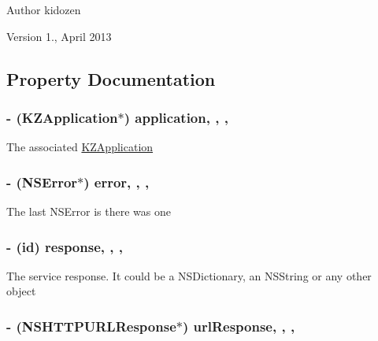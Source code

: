 \begin{DoxyAuthor}{Author}
kidozen 
\end{DoxyAuthor}
\begin{DoxyVersion}{Version}
1., April 2013 
\end{DoxyVersion}


\subsection{Property Documentation}
\hypertarget{interface_k_z_response_a169745670544dd0a05c0f1cca2815588}{
\subsubsection[{application}]{\setlength{\rightskip}{0pt plus 5cm}-\/ ({\bf K\-Z\-Application}$\ast$) application\hspace{0.3cm}{\ttfamily [read]}, {\ttfamily [write]}, {\ttfamily [nonatomic]}, {\ttfamily [strong]}}}\label{interface_k_z_response_a169745670544dd0a05c0f1cca2815588}
The associated \hyperlink{interface_k_z_application}{K\-Z\-Application} \hypertarget{interface_k_z_response_a34afbbe6c009bbb883840f60a9dec08b}{
\subsubsection[{error}]{\setlength{\rightskip}{0pt plus 5cm}-\/ (N\-S\-Error$\ast$) error\hspace{0.3cm}{\ttfamily [read]}, {\ttfamily [write]}, {\ttfamily [nonatomic]}, {\ttfamily [strong]}}}\label{interface_k_z_response_a34afbbe6c009bbb883840f60a9dec08b}
The last N\-S\-Error is there was one \hypertarget{interface_k_z_response_a707d53657a06ad5499fd8befb0c4b489}{
\subsubsection[{response}]{\setlength{\rightskip}{0pt plus 5cm}-\/ (id) response\hspace{0.3cm}{\ttfamily [read]}, {\ttfamily [write]}, {\ttfamily [nonatomic]}, {\ttfamily [strong]}}}\label{interface_k_z_response_a707d53657a06ad5499fd8befb0c4b489}
The service response. It could be a N\-S\-Dictionary, an N\-S\-String or any other object \hypertarget{interface_k_z_response_a855244b2bfb700d9043c7b0ac0138ef6}{
\subsubsection[{url\-Response}]{\setlength{\rightskip}{0pt plus 5cm}-\/ (N\-S\-H\-T\-T\-P\-U\-R\-L\-Response$\ast$) url\-Response\hspace{0.3cm}{\ttfamily [read]}, {\ttfamily [write]}, {\ttfamily [nonatomic]}, {\ttfamily [strong]}}}\label{interface_k_z_response_a855244b2bfb700d9043c7b0ac0138ef6}
